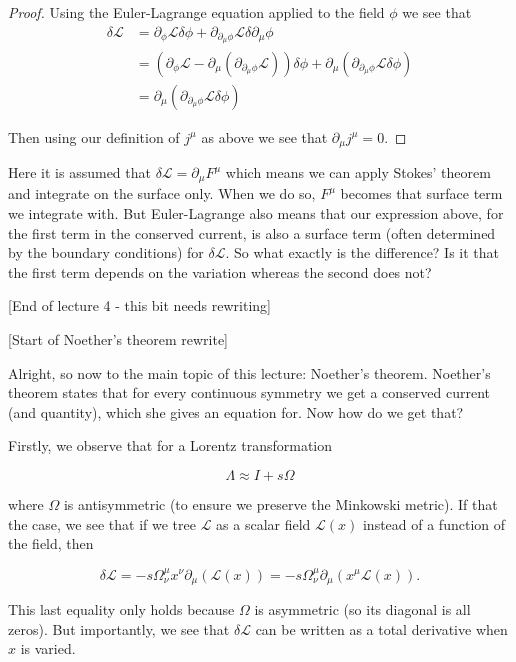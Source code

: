 \documentclass{article}
\theoremstyle{definition}
\begin{document}
\begin{proof}
  Using the Euler-Lagrange equation applied to the field $\phi$ we see that
  \begin{align*}
    \delta \mathcal{L}
    &= \partial_\phi \mathcal{L} \delta \phi + \partial_{\partial_\mu \phi} \mathcal{L} \delta \partial_\mu \phi \\
    &= (\partial_\phi \mathcal{L} - \partial_\mu (\partial_{\partial_\mu \phi} \mathcal{L})) \delta \phi + \partial_\mu (\partial_{\partial_\mu \phi} \mathcal{L} \delta \phi) \\
    &= \partial_\mu (\partial_{\partial_\mu \phi} \mathcal{L} \delta \phi)
  \end{align*}

  Then using our definition of $j^\mu$ as above we see that $\partial_\mu j^\mu
  = 0$.
\end{proof}

Here it is assumed that $\delta \mathcal{L} = \partial_\mu F^\mu$ which means we
can apply Stokes' theorem and integrate on the surface only. When we do so,
$F^\mu$ becomes that surface term we integrate with. But Euler-Lagrange also
means that our expression above, for the first term in the conserved current, is
also a surface term (often determined by the boundary conditions) for $\delta
\mathcal{L}$. So what exactly is the difference? Is it that the first term
depends on the variation whereas the second does not?

[End of lecture 4 - this bit needs rewriting]

[Start of Noether's theorem rewrite]

Alright, so now to the main topic of this lecture: Noether's theorem. Noether's
theorem states that for every continuous symmetry we get a conserved current
(and quantity), which she gives an equation for. Now how do we get that?

Firstly, we observe that for a Lorentz transformation

$$ \Lambda \approx I + s\Omega $$

where $\Omega$ is antisymmetric (to ensure we preserve the Minkowski metric). If
that the case, we see that if we tree $\mathcal{L}$ as a scalar field
$\mathcal{L}(x)$ instead of a function of the field, then

$$ \delta \mathcal{L} = - s\Omega^\mu_\nu x^\nu \partial_\mu(\mathcal{L}(x)) =
-s\Omega^\mu_\nu \partial_\mu (x^\mu \mathcal{L}(x)). $$

This last equality only holds because $\Omega$ is asymmetric (so its diagonal is
all zeros). But importantly, we see that $\delta \mathcal{L}$ can be written as
a total derivative when $x$ is varied.
\end{document}
